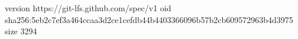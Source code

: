 version https://git-lfs.github.com/spec/v1
oid sha256:5eb2c7ef3a464ccaa3d2ce1cefdb44b4403366096b57b2cb609572963b4d3975
size 3294
